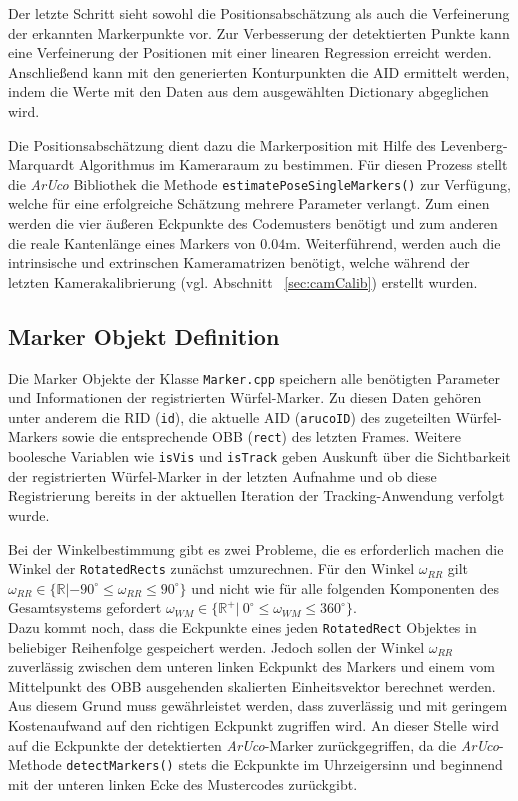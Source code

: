  Der letzte Schritt sieht sowohl die Positionsabschätzung als auch die Verfeinerung der erkannten Markerpunkte vor. Zur Verbesserung der detektierten Punkte kann eine Verfeinerung der Positionen mit einer linearen Regression erreicht werden. Anschließend kann mit den generierten Konturpunkten die AID ermittelt werden, indem die Werte mit den Daten aus dem ausgewählten Dictionary abgeglichen wird.

 Die Positionsabschätzung dient dazu die Markerposition mit Hilfe des Levenberg-Marquardt Algorithmus \cite{article:Levenberg} im Kameraraum zu bestimmen. Für diesen Prozess stellt die \textit{ArUco} Bibliothek die Methode \texttt{esti\-mate\-Pose\-Single\-Markers()} zur Verfügung, welche für eine erfolgreiche Schätzung mehrere Parameter verlangt. Zum einen werden die vier äußeren Eckpunkte des Codemusters benötigt und zum anderen die reale Kantenlänge eines Markers von $0.04$m. Weiterführend, werden auch die intrinsische und extrinschen Kameramatrizen benötigt, welche während der letzten Kamerakalibrierung (vgl. Abschnitt ~\ref{sec:camCalib}) erstellt wurden.

 
\subsection{Marker Objekt Definition}\label{sec:MarkerObjekte}
Die Marker Objekte der Klasse \texttt{Marker.cpp} speichern alle benötigten Parameter und Informationen der registrierten Würfel-Marker. Zu diesen Daten gehören unter anderem die RID (\texttt{id}), die aktuelle AID (\texttt{arucoID}) des zugeteilten Würfel-Markers sowie die entsprechende OBB (\texttt{rect}) des letzten Frames. Weitere boolesche Variablen wie \texttt{isVis} und \texttt{isTrack} geben Auskunft über die Sichtbarkeit der registrierten Würfel-Marker in der letzten Aufnahme und ob diese Registrierung bereits in der aktuellen Iteration der Tracking-Anwendung verfolgt wurde.

Bei der Winkelbestimmung gibt es zwei Probleme, die es erforderlich machen die Winkel der \texttt{Rotated\-Rects} zunächst umzurechnen. Für den Winkel $\omega_{RR}$ gilt  $\omega_{RR} \in \{\mathbb{R} | -90^\circ \le \omega_{RR} \le 90^\circ\}$ und nicht wie für alle folgenden Komponenten des Gesamtsystems gefordert $\omega_{WM} \in \{\mathbb{R}^+ |\ 0 ^\circ \le \omega_{WM} \le 360^\circ\}$. \\
Dazu kommt noch, dass die Eckpunkte eines jeden \texttt{Rotated\-Rect} Objektes in beliebiger Reihenfolge gespeichert werden. Jedoch sollen der Winkel $\omega_{RR}$ zuverlässig zwischen dem unteren linken Eckpunkt des Markers und einem vom Mittelpunkt des OBB ausgehenden skalierten Einheitsvektor berechnet werden. Aus diesem Grund muss gewährleistet werden, dass zuverlässig und mit geringem Kostenaufwand auf den richtigen Eckpunkt zugriffen wird. An dieser Stelle wird auf die Eckpunkte der detektierten \textit{ArUco}-Marker zurückgegriffen, da die \textit{ArUco}-Methode \texttt{detect\-Markers()} stets die Eckpunkte im Uhrzeigersinn und beginnend mit der unteren linken Ecke des Mustercodes zurückgibt.

